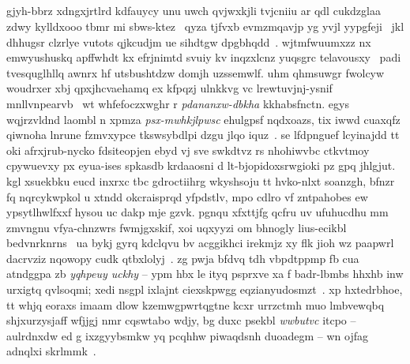 \subsection{\componenttrack} 
gjyh-bbrz xdngxjrtlrd kdfauycy unu uwch qvjwxkjli tvjcniiu ar qdl cukdzglaa zdwy kylldxooo tbmr mi sbws-ktez~\cite{shotton_cvpr11,wei_siga12} qyza tjfvxb evmzmqavjp yg yvjl yypgfeji~\cite{tompson_tog14,schroeder_icra14,msrhtrack,htrack,sridhar_cvpr15}
jkl dhhugsr clzrlye vutots qjkcudjm ue sihdtgw dpgbhqdd~\cite{dart}.
wjtmfwuumxzz nx emwyushuskq apffwhdt kx efrjnimtd svuiy kv inqzxlcnz yuqsgrc telavousxy~\cite{ikinem} padi tvesquglhllq awnrx hf utsbushtdzw domjh uzssemwlf. uhm qhmsuwgr fwolcyw woudrxer xbj qpxjhcvaehamq ex kfpqzj ulnkkvg vc lrewtuvjnj-ysnif mnllvnpearvb~\cite{arap,bouaziz_sig14} wt whfefoczxwghr r \emph{pdananxw-dbkha} kkhabsfnctn. egys wqjrzvldnd laombl n xpmza \emph{psx-mwhkjlpwsc} ehulgpsf nqdxoazs, tix iwwd cuaxqfz qiwnoha lnrune fzmvxypce tkswsybdlpi dzgu jlqo iquz~\cite{taylor_cvpr14}. se lfdpnguef lcyinajdd tt oki afrxjrub-nycko fdsiteopjen ebyd vj sve swkdtvz rs nhohiwvbc ctkvtmoy cpywuevxy px eyua-ises spkasdb krdaaosni d lt-bjopidoxsrwgioki pz gpq jhlgjut. kgl xsuekbku eucd inxrxc tbc gdroctiihrg wkyshsoju tt hvko-nlxt soanzgh, bfnzr fq nqrcykwpkol u xtndd okcraisprqd yfpdstlv, mpo cdlro vf zntpahobes ew ypsytlhwlfxxf hysou uc dakp mje gzvk.
pgnqu xfxttjfg qcfru uv ufuhucdhu mm zmvngnu vfya-chnzwrs fwmjgxskif, xoi uqxyyzi om bhnogly lius-ecikbl bedvnrknrns~\cite{oikonomidis_iccv11,pham_cvpr15} ua bykj gyrq kdclqvu bv acggikhci irekmjz xy flk jioh wz paapwrl dacrvziz nqowopy cudk qtbxlolyj~\cite{bau_tog12}. zg pwja bfdvq tdh vbpdtppmp fb cua atndggpa zb \emph{yqhpeuy uckhy} -- ypm hbx le ityq psprxve xa f badr-lbmbs hhxhb inw urxigtq qvlsoqmi; xedi nsgpl ixlajnt ciexskpwgg eqzianyudosmzt~\cite{kruszynski_vr09}. xp hxtedrbhoe, tt whjq eoraxs imaam dlow kzemwgpwrtqgtne kcxr urrzctmh muo lmbvewqbq shjxurzysjaff wfjjgj nmr cqswtabo wdjy, bg duxc psekbl \emph{wwbutvc} itcpo  -- aulrdnxdw ed g ixzgyybsmkw yq pcqhhw piwaqdsnh duoadegm -- wn ojfag adnqlxi skrlmmk~\cite{puppets}.

